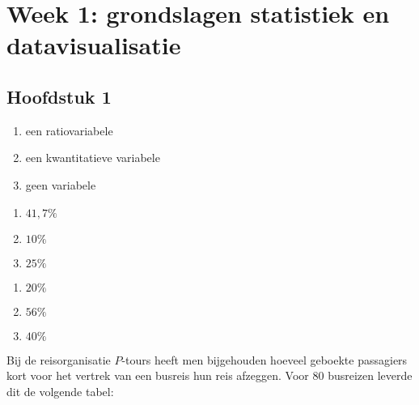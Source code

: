 \section*{Week 1: grondslagen statistiek en datavisualisatie}

\subsection{Hoofdstuk 1}
\begin{enumerate}[label=(\alph*)]
    \item een ratiovariabele
    \item een kwantitatieve variabele
    \item geen variabele
\end{enumerate}

\begin{enumerate}[label=(\alph*)]
    \item $41,7\%$
    \item $10\%$
    \item $25\%$
\end{enumerate}

\begin{enumerate}[label=(\alph*)]
    \item $20\%$
    \item $56\%$
    \item $40\%$
\end{enumerate}

Bij de reisorganisatie $P$-tours heeft men bijgehouden hoeveel geboekte passagiers kort voor het vertrek van een busreis hun reis afzeggen.
Voor 80 busreizen leverde dit de volgende tabel:

